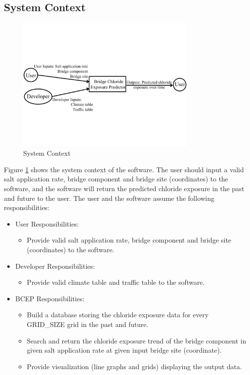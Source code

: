 \documentclass[12pt]{article}
\begin{document}
\subsection{System Context}
\begin{figure}[h!]
\begin{center}
 \includegraphics[width=0.8\textwidth]{SystemContextFigure}
\caption{System Context}
\label{Fig_SystemContext} 
\end{center}
\end{figure}


Figure \ref{Fig_SystemContext} shows the system context of the software. The user should input a valid  salt application rate, bridge component and bridge site (coordinates) to the software, and the software will return the predicted chloride exposure in the past and future to the user. The user and the software assume the following responsibilities:

\begin{itemize}
\item User Responsibilities:
\begin{itemize}
\item Provide valid salt application rate, bridge component and bridge site (coordinates) to the software.
\end{itemize}

\item Developer Responsibilities:
\begin{itemize}
\item Provide valid climate table and traffic table to the software.
\end{itemize}

\item BCEP Responsibilities:
\begin{itemize}
\item Build a database storing the chloride exposure data for every GRID\_SIZE grid in the past and future.
\item Search and return the chloride exposure trend of the bridge component in given salt application rate at given input bridge site (coordinate).
\item Provide visualization (line graphs and grids) displaying the output data.
\end{itemize}
\end{itemize}
\end{document}
